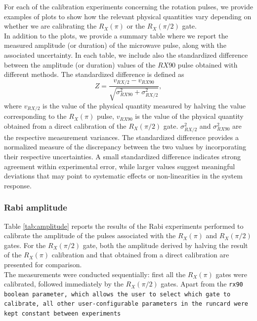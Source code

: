 For each of the calibration experiments concerning the rotation pulses, we provide examples of plots to show how the relevant physical quantities vary depending on whether we are calibrating the $R_X(\pi)$ or the $R_X(\pi/2)$ gate.\\
In addition to the plots, we provide a summary table where we report the measured amplitude (or duration) of the microwave pulse, along with the associated uncertainty.
In each table, we include also the standardized difference between the amplitude (or duration) values of the $RX90$ pulse obtained with different methods.
The standardized difference is defined as
\begin{equation}\label{eq:std_difference}
    Z = \frac{v_{RX/2}-v_{RX90}}{\sqrt{\sigma^2_{RX90} + \sigma^2_{RX/2}}},
\end{equation}
where $v_{RX/2}$ is the value of the physical quantity measured by halving the value corresponding to the $R_X(\pi)$ pulse, $v_{RX90}$ is the value of the physical quantity obtained from a direct calibration of the $R_X(\pi/2)$ gate.
$\sigma^2_{RX/2}$ and $\sigma^2_{RX90}$ are the respective measurement variances.
The standardized difference provides a normalized measure of the discrepancy between the two values by incorporating their respective uncertainties. 
A small standardized difference indicates strong agreement within experimental error, while larger values suggest meaningful deviations that may point to systematic effects or non-linearities in the system response.

\subsubsection{Rabi amplitude}
Table \ref{tab:amplitude} reports the results of the Rabi experiments performed to calibrate the amplitude of the pulses associated with the $R_X(\pi)$ and $R_X(\pi/2)$ gates.
For the $R_X(\pi/2)$ gate, both the amplitude derived by halving the result of the $R_X(\pi)$ calibration and that obtained from a direct calibration are presented for comparison.\\
The measurements were conducted sequentially: first all the $R_X(\pi)$ gates were calibrated, followed immediately by the $R_X(\pi/2)$ gates. 
Apart from the \tt{rx90} boolean parameter, which allows the user to select which gate to calibrate, all other user-configurable parameters in the runcard were kept constant between experiments
